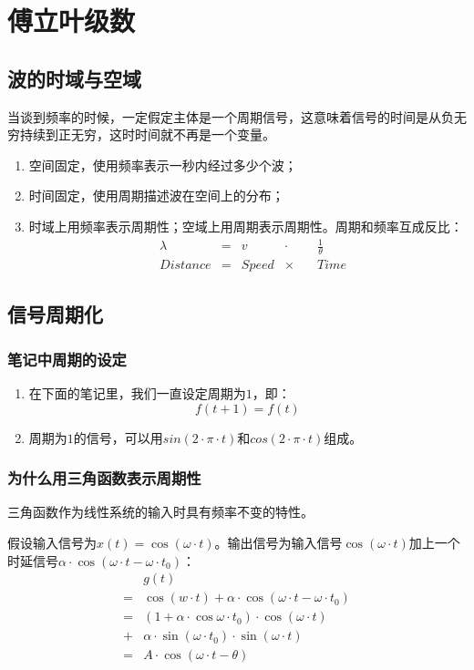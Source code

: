 \chapter{傅立叶级数}
\section{波的时域与空域}
当谈到频率的时候，一定假定主体是一个周期信号，这意味着信号的时间是从负无穷持续到正无穷，这时时间就不再是一个变量。
\begin{enumerate}
	\item 空间固定，使用频率表示一秒内经过多少个波；
	\item 时间固定，使用周期描述波在空间上的分布；
	\item 时域上用频率表示周期性；空域上用周期表示周期性。周期和频率互成反比：
	      \begin{align*}
		       & \lambda  & = & v     & \cdot   \quad & \frac{1}{\theta} \\
		       & Distance & = & Speed & \times  \quad & Time
	      \end{align*}
\end{enumerate}

\section{信号周期化}
\subsection{笔记中周期的设定}
\begin{enumerate}
	\item 在下面的笔记里，我们一直设定周期为$1$，即：
	      \begin{equation}
		      f(t+1)=f(t)
	      \end{equation}
	\item 周期为$1$的信号，可以用$sin(2\cdot \pi \cdot t)$和$cos(2\cdot \pi \cdot t)$组成。

\end{enumerate}
\subsection{为什么用三角函数表示周期性}
三角函数作为线性系统的输入时具有频率不变的特性。

假设输入信号为$x(t)=\cos (\omega\cdot t)$。输出信号为输入信号$\cos (\omega\cdot t)$加上一个时延信号$\alpha\cdot \cos (\omega\cdot t-\omega\cdot t_0)$：
\begin{align*}
	  & g(t)                                                            \\
	= & \cos(w\cdot t)+\alpha\cdot \cos (\omega\cdot t-\omega\cdot t_0) \\
	= & (1+\alpha \cdot \cos\omega\cdot t_0)\cdot \cos (\omega\cdot t)  \\
	+ & \alpha\cdot \sin(\omega\cdot t_0)\cdot \sin(\omega\cdot t)      \\
	= & A\cdot \cos(\omega\cdot t-\theta)
\end{align*}


